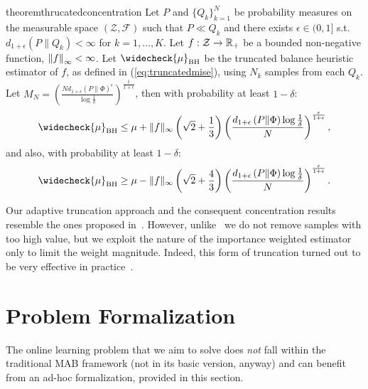 \documentclass{article}
\begin{document}
\begin{restatable}{theorem}{thrucatedconcentration}\label{lem:thrucatedconcentration}
	Let $P$ and $\{ Q_k \}_{k=1}^N$ be probability measures on the measurable space $(\mathcal{Z},\mathcal{F})$ such that $P\ll Q_k$ and there exists $\epsilon \in (0,1]$ s.t. $d_{1+\epsilon}(P\|Q_k)<\infty$ for $k=1,\dots,K$. Let $f:\mathcal{Z}\to\Reals_{+}$ be a bounded non-negative function, \ie $\norm[\infty]{f}<\infty$. Let $\widecheck{\mu}_{\text{BH}}$ be the truncated balance heuristic estimator of $f$, as defined in (\ref{eq:truncatedmise}), using $N_k$ \iid samples from each $Q_k$. 
	Let $M_N = \left( \frac{N d_{1+\epsilon}\left( P \| \Phi  \right)^{\epsilon} }{\log \frac{1}{\delta}} \right) ^{\frac{1}{1+\epsilon}}$, then with probability at least $1-\delta$:
    \begin{equation}\label{eq:1.1}
        \widecheck{\mu}_{\text{BH}} \le \mu + \|f\|_{\infty} \left(\sqrt{2} + \frac{1}{3} \right)  \left(\frac{ d_{1+\epsilon}\left( P \| \Phi  \right) \log  \frac{1}{\delta}  }{N} \right)^{\frac{\epsilon}{1+\epsilon}},
    \end{equation}
    and also, with probability at least $1-\delta$:
    \begin{equation}\label{eq:1.2}
        \widecheck{\mu}_{\text{BH}} \ge \mu - \|f\|_{\infty} \left(\sqrt{2} + \frac{4}{3} \right) \left(\frac{ d_{1+\epsilon}\left( P \| \Phi  \right) \log  \frac{1}{\delta}  }{N} \right)^{\frac{\epsilon}{1+\epsilon}}.
    \end{equation}
\end{restatable}

Our adaptive truncation approach and the consequent concentration results resemble the ones proposed in~\citet{bubeck2013bandits}. However, unlike~\citet{bubeck2013bandits} we do not remove samples with too high value, but we exploit the nature of the importance weighted estimator only to limit the weight magnitude. Indeed, this form of truncation turned out to be very effective in practice~\cite{ionides2008truncated}.


\section{Problem Formalization}\label{sec:problem}
The online learning problem that we aim to solve does \textit{not} fall within the traditional MAB framework (not in its basic version, anyway) and can benefit from an ad-hoc formalization, provided in this section.
\end{document}
